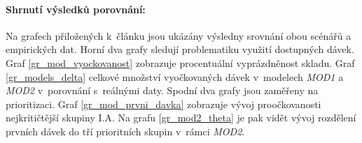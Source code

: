 \paragraph{Shrnutí výsledků porovnání:} Na grafech přiložených k~článku jsou ukázány výsledny srovnání obou scénářů a empirických dat. Horní dva grafy sledují problematiku využití dostupných dávek. Graf \ref{gr_mod_vyockovanost} zobrazuje procentuální vyprázdněnost skladu. Graf \ref{gr_models_delta} celkové množství vyočkovaných dávek v~modelech \emph{MOD1} a \emph{MOD2} v~porovnání s~reálnými daty.
%
Spodní dva grafy jsou zaměřeny na prioritizaci.
Graf \ref{gr_mod_prvni_davka} zobrazuje vývoj proočkovanosti nejkritičtější skupiny I.A. Na grafu  \ref{gr_mod2_theta} je pak vidět vývoj rozdělení prvních dávek do tří prioritních skupin v~rámci \emph{MOD2}.


